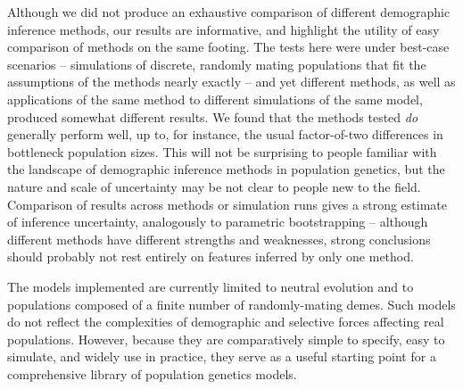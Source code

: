 \documentclass[12pt,halfline,a4paper]{ouparticle}
\newcommand{\adk}[1]{\textcolor{red}{ADK: #1}}
\begin{document}
Although we did not produce an exhaustive comparison of different demographic inference methods,
our results are informative,
and highlight the utility of easy comparison of methods on the same footing.
The tests here were under best-case scenarios --
simulations of discrete, randomly mating populations that fit the assumptions of the methods nearly exactly --
and yet different methods, as well as applications of the same method
to different simulations of the same model,
produced somewhat different results.
We found that the methods tested \emph{do} generally perform well,
up to, for instance, the usual factor-of-two differences in bottleneck population sizes.
This will not be surprising to people familiar with the landscape of
demographic inference methods in population genetics,
but the nature and scale of uncertainty may be not clear to people new to the field.
Comparison of results across methods or simulation runs
gives a strong estimate of inference uncertainty, analogously to parametric bootstrapping --
although different methods have different strengths and weaknesses,
strong conclusions should probably not rest entirely on features inferred by only one method.

The models implemented are currently limited to neutral evolution and to populations 
composed of a finite number of randomly-mating demes. Such models do not reflect 
the complexities of demographic and selective forces affecting real populations. 
However, because they are comparatively simple to specify, easy to simulate, 
and widely use in practice,  they serve as a useful starting point for a 
comprehensive library of population genetics models. 

\end{document}
